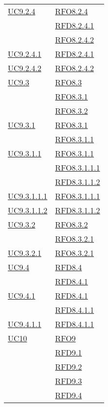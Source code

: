 \begin{longtable}{|>{\centering}m{5cm}|m{5cm}<{\centering}|}
\hyperref[UC9.2.4]{UC9.2.4} & \hyperlink{RFO8.2.4}{RFO8.2.4}\\
& \hyperlink{RFD8.2.4.1}{RFD8.2.4.1}\\
& \hyperlink{RFO8.2.4.2}{RFO8.2.4.2}\\ \hline
\hyperref[UC9.2.4.1]{UC9.2.4.1} & \hyperlink{RFD8.2.4.1}{RFD8.2.4.1}\\ \hline
\hyperref[UC9.2.4.2]{UC9.2.4.2} & \hyperlink{RFO8.2.4.2}{RFO8.2.4.2}\\ \hline
\hyperref[UC9.3]{UC9.3} & \hyperlink{RFO8.3}{RFO8.3}\\
& \hyperlink{RFO8.3.1}{RFO8.3.1}\\
& \hyperlink{RFO8.3.2}{RFO8.3.2}\\ \hline
\hyperref[UC9.3.1]{UC9.3.1} & \hyperlink{RFO8.3.1}{RFO8.3.1}\\
& \hyperlink{RFO8.3.1.1}{RFO8.3.1.1}\\ \hline
\hyperref[UC9.3.1.1]{UC9.3.1.1} & \hyperlink{RFO8.3.1.1}{RFO8.3.1.1}\\
& \hyperlink{RFO8.3.1.1.1}{RFO8.3.1.1.1}\\
& \hyperlink{RFD8.3.1.1.2}{RFD8.3.1.1.2}\\ \hline
\hyperref[UC9.3.1.1.1]{UC9.3.1.1.1} & \hyperlink{RFO8.3.1.1.1}{RFO8.3.1.1.1}\\ \hline
\hyperref[UC9.3.1.1.2]{UC9.3.1.1.2} & \hyperlink{RFD8.3.1.1.2}{RFD8.3.1.1.2}\\ \hline
\hyperref[UC9.3.2]{UC9.3.2} & \hyperlink{RFO8.3.2}{RFO8.3.2}\\
& \hyperlink{RFO8.3.2.1}{RFO8.3.2.1}\\ \hline
\hyperref[UC9.3.2.1]{UC9.3.2.1} & \hyperlink{RFO8.3.2.1}{RFO8.3.2.1}\\ \hline
\hyperref[UC9.4]{UC9.4} & \hyperlink{RFD8.4}{RFD8.4}\\
& \hyperlink{RFD8.4.1}{RFD8.4.1}\\ \hline
\hyperref[UC9.4.1]{UC9.4.1} & \hyperlink{RFD8.4.1}{RFD8.4.1}\\
& \hyperlink{RFD8.4.1.1}{RFD8.4.1.1}\\ \hline
\hyperref[UC9.4.1.1]{UC9.4.1.1} & \hyperlink{RFD8.4.1.1}{RFD8.4.1.1}\\ \hline
\hyperref[UC10]{UC10} & \hyperlink{RFO9}{RFO9}\\
& \hyperlink{RFD9.1}{RFD9.1}\\
& \hyperlink{RFD9.2}{RFD9.2}\\
& \hyperlink{RFD9.3}{RFD9.3}\\
& \hyperlink{RFD9.4}{RFD9.4}\\

\end{longtable}

